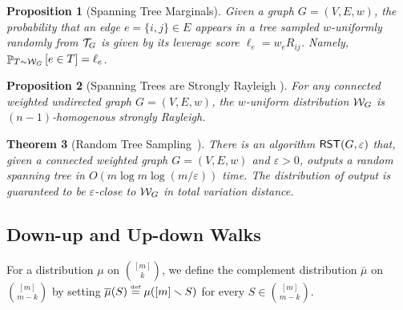 \documentclass[11pt]{article}
\newtheorem{theorem}{Theorem} \newtheorem{lemma}[theorem]{Lemma} \newtheorem{proposition}[theorem]{Proposition} \newtheorem{corollary}[theorem]{Corollary} \newtheorem{definition}[theorem]{Definition} \newtheorem{conjecture}[theorem]{Conjecture} \newtheorem{claim}[theorem]{Claim} \newtheorem{fact}[theorem]{Fact}
\newcommand{\parens}[1]{( #1 )}
\newcommand{\sqb}[1]{\left[ #1 \right]}
\newcommand{\sets}[1]{\{ #1 \}}
\newcommand{\defeq}{\stackrel{\smash{\text{\tiny\rm def}}}{=}}
\begin{document}
{\begin{proposition}[Spanning Tree Marginals]\label{lemma:Spanning-Tree-Marginals}
  Given a graph $G=\parens{V,E,w}$, the probability that an edge $e=\sets{i,j} \in E $
  appears in a tree sampled $w$-uniformly randomly from $\mathcal{T}_G $ is given by its
  leverage score $\ell_e = w_e R_{ij}$.
  Namely, $\pb_{ T \sim \cW_{G } }\sqb{e\in T}=\ell_e$.
\end{proposition}

\begin{proposition}[Spanning Trees are Strongly Rayleigh {\cite[Theorem 3.6]{borcea2009negative}}]
	For any connected weighted undirected graph $G =\parens{V,E,w}$, the $w$-uniform distribution $\mathcal{W}_G$ is $\parens{n-1}$-homogenous strongly Rayleigh.
\end{proposition}

\begin{theorem}[Random Tree Sampling~{\cite[Theorem 2]{anari2021log}}]\label{thm:classical-random-tree-sampling}
	There is an algorithm $\RST\parens{G,\varepsilon}$ that, given a connected weighted graph $G=\parens{V,E,w}$ and $\varepsilon>0$, outputs a random spanning tree in $O\parens{m\log m\log\parens{m/\varepsilon}}$ time. The distribution of output is guaranteed to be $\varepsilon$-close to $\mathcal{W}_G$ in total variation distance.
\end{theorem}



\subsection{Down-up and Up-down Walks}
For a distribution $\mu$ on $\binom{\sqb{m}}{k}$, 
we define the  complement
distribution $\bar\mu$ on $\binom{\sqb{m}}{m -k}$ by setting 
$\bar \mu \parens{S}\defeq\mu\parens{\sqb{m}\smallsetminus S}$ for every $S \in \binom{\sqb{m}}{m -k}$.


}
\end{document}
